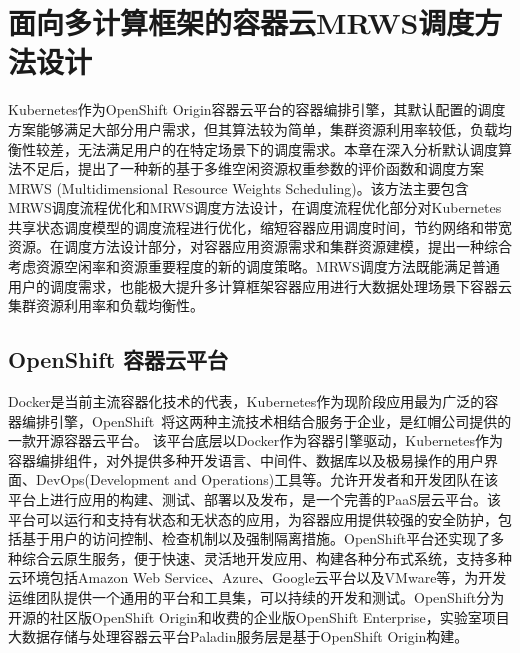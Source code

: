 \chapter{面向多计算框架的容器云MRWS调度方法设计}
Kubernetes作为OpenShift Origin容器云平台的容器编排引擎，其默认配置的调度方案能够满足大部分用户需求，但其算法较为简单，集群资源利用率较低，负载均衡性较差，无法满足用户的在特定场景下的调度需求。本章在深入分析默认调度算法不足后，提出了一种新的基于多维空闲资源权重参数的评价函数和调度方案MRWS (Multidimensional Resource Weights Scheduling)。该方法主要包含MRWS调度流程优化和MRWS调度方法设计，在调度流程优化部分对Kubernetes共享状态调度模型的调度流程进行优化，缩短容器应用调度时间，节约网络和带宽资源。在调度方法设计部分，对容器应用资源需求和集群资源建模，提出一种综合考虑资源空闲率和资源重要程度的新的调度策略。MRWS调度方法既能满足普通用户的调度需求，也能极大提升多计算框架容器应用进行大数据处理场景下容器云集群资源利用率和负载均衡性。

\section{OpenShift 容器云平台}
Docker是当前主流容器化技术的代表，Kubernetes作为现阶段应用最为广泛的容器编排引擎，OpenShift~\cite{Lossent2017PaaS}将这两种主流技术相结合服务于企业，是红帽公司提供的一款开源容器云平台。
该平台底层以Docker作为容器引擎驱动，Kubernetes作为容器编排组件，对外提供多种开发语言、中间件、数据库以及极易操作的用户界面、DevOps(Development and Operations)工具等。允许开发者和开发团队在该平台上进行应用的构建、测试、部署以及发布，是一个完善的PaaS层云平台。该平台可以运行和支持有状态和无状态的应用，为容器应用提供较强的安全防护，包括基于用户的访问控制、检查机制以及强制隔离措施。OpenShift平台还实现了多种综合云原生服务，便于快速、灵活地开发应用、构建各种分布式系统，支持多种云环境包括Amazon Web Service、Azure、Google云平台以及VMware等，为开发运维团队提供一个通用的平台和工具集，可以持续的开发和测试。OpenShift分为开源的社区版OpenShift Origin和收费的企业版OpenShift Enterprise，实验室项目大数据存储与处理容器云平台Paladin服务层是基于OpenShift Origin构建。

